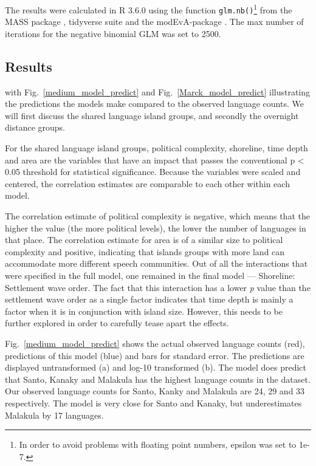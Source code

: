 \documentclass[a4paper,10pt]{article} %
\begin{document}
The results were calculated in R 3.6.0 \citep{R} using the function \texttt{glm.nb()}\footnote{In order to avoid problems with floating point numbers, epsilon was set to 1e-7.} from the MASS package \citet{choi2014msstats}, tidyverse suite \citep{tidyverse13} and the modEvA-package \citep{barbosa2016package}. The max number of iterations for the negative binomial GLM was set to 2500.

\subsection{Results}
 
 
 with Fig.~\ref{medium_model_predict} and Fig.~\ref{Marck_model_predict} illustrating the predictions the models make compared to the observed language counts. We will first discuss the shared language island groups, and secondly the overnight distance groups.

For the shared language island groups, political complexity, shoreline, time depth and area are the variables that have an impact that passes the conventional p < 0.05 threshold for statistical significance. Because the variables were scaled and centered, the correlation estimates are comparable to each other within each model.

The correlation estimate of political complexity is negative, which means that the higher the value (the more political levels), the lower the number of languages in that place. The correlation estimate for area is of a similar size to political complexity and positive, indicating that islands groups with more land can accommodate more different speech communities. Out of all the interactions that were specified in the full model, one remained in the final model --- Shoreline: Settlement wave order. The fact that this interaction has a lower \emph{p} value than the settlement wave order as a single factor indicates that time depth is mainly a factor when it is in conjunction with island size. However, this needs to be further explored in order to carefully tease apart the effects.

Fig.~\ref{medium_model_predict} shows the actual observed language counts (red), predictions of this model (blue) and bars for standard error. The predictions are displayed untransformed (a) and log-10 transformed (b). The model does predict that Santo, Kanaky and Malakula has the highest language counts in the dataset. Our observed language counts for Santo, Kanky and Malakula are 24, 29 and 33 respectively. The model is very close for Santo and Kanaky, but underestimates Malakula by 17 languages.
\end{document}
